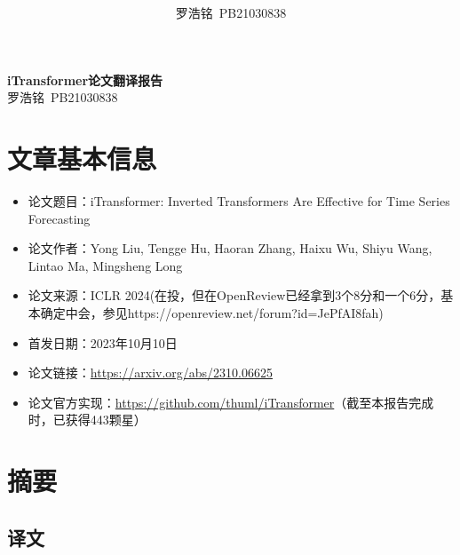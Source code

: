 \documentclass[twoside,12pt]{article}
\title{ }
\author{罗浩铭\ PB21030838}
\begin{document}
\fancyhf{} %
\fancyfoot[C]{\thepage} %
\fancyhead[l]{\footnotesize  }

\renewcommand{\headrulewidth}{0pt} %

\begin{center}
    \textbf{\LARGE{iTransformer论文翻译报告}}\\
    \vspace{0.2cm}
    \large{罗浩铭\ PB21030838}
\end{center}


\section{文章基本信息}

\begin{itemize}
    \item 论文题目：iTransformer: Inverted Transformers Are Effective for Time Series Forecasting
    \item 论文作者：Yong Liu, Tengge Hu, Haoran Zhang, Haixu Wu, Shiyu Wang, Lintao Ma, Mingsheng Long
    \item 论文来源：ICLR 2024(在投，但在OpenReview已经拿到3个8分和一个6分，基本确定中会，参见https://openreview.net/forum?id=JePfAI8fah)
    \item 首发日期：2023年10月10日
    \item 论文链接：\url{https://arxiv.org/abs/2310.06625}
    \item 论文官方实现：\url{https://github.com/thuml/iTransformer}（截至本报告完成时，已获得443颗星）
\end{itemize}

\section{摘要}
\subsection{译文}
\end{document}
